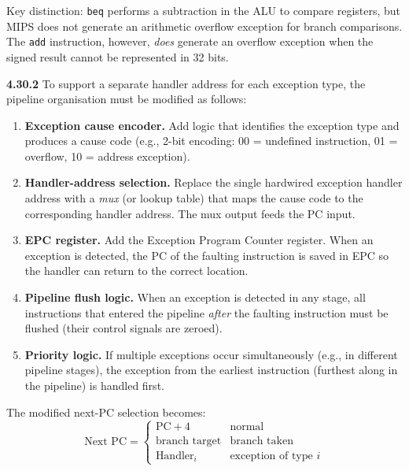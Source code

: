 \noindent Key distinction: \texttt{beq} performs a subtraction in the ALU to compare
registers, but MIPS does not generate an arithmetic overflow exception for
branch comparisons.  The \texttt{add} instruction, however, \emph{does}
generate an overflow exception when the signed result cannot be represented in
32 bits.

\medskip\noindent\textbf{4.30.2}
To support a separate handler address for each exception type, the pipeline
organisation must be modified as follows:

\begin{enumerate}
\item \textbf{Exception cause encoder.}  Add logic that identifies the
      exception type and produces a cause code (e.g., 2-bit encoding:
      00 = undefined instruction, 01 = overflow, 10 = address exception).

\item \textbf{Handler-address selection.}  Replace the single hardwired
      exception handler address with a \emph{mux} (or lookup table) that maps
      the cause code to the corresponding handler address.  The mux output
      feeds the PC input.

\item \textbf{EPC register.}  Add the Exception Program Counter register.
      When an exception is detected, the PC of the faulting instruction is
      saved in EPC so the handler can return to the correct location.

\item \textbf{Pipeline flush logic.}  When an exception is detected in any
      stage, all instructions that entered the pipeline \emph{after} the
      faulting instruction must be flushed (their control signals are zeroed).

\item \textbf{Priority logic.}  If multiple exceptions occur simultaneously
      (e.g., in different pipeline stages), the exception from the earliest
      instruction (furthest along in the pipeline) is handled first.
\end{enumerate}

\noindent The modified next-PC selection becomes:
\[
\text{Next PC} = \begin{cases}
  \text{PC} + 4 & \text{normal} \\
  \text{branch target} & \text{branch taken} \\
  \text{Handler}_i & \text{exception of type } i
\end{cases}
\]

